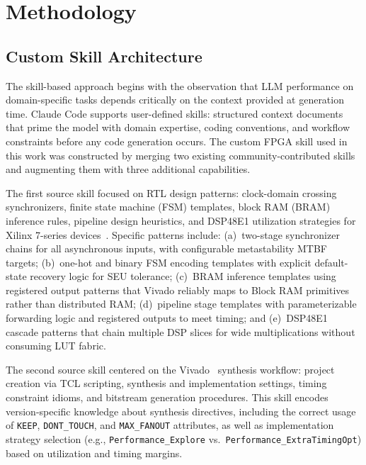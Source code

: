 \documentclass[journal]{IEEEtran}
\begin{document}
\section{Methodology}
\label{sec:methodology}

\subsection{Custom Skill Architecture}
\label{sec:skill}

The skill-based approach begins with the observation that LLM
performance on domain-specific tasks depends critically on the context
provided at generation time.  Claude Code supports user-defined skills:
structured context documents that prime the model with domain expertise,
coding conventions, and workflow constraints before any code generation
occurs.  The custom FPGA skill used in this work was constructed by
merging two existing community-contributed skills and augmenting them
with three additional capabilities.

The first source skill focused on RTL design patterns: clock-domain
crossing synchronizers, finite state machine (FSM) templates, block RAM
(BRAM) inference rules, pipeline design heuristics, and DSP48E1
utilization strategies for Xilinx 7-series
devices~\cite{xilinx2020ds180}.  Specific patterns include: (a)~two-stage
synchronizer chains for all asynchronous inputs, with configurable
metastability MTBF targets; (b)~one-hot and binary FSM encoding templates
with explicit default-state recovery logic for SEU tolerance;
(c)~BRAM inference templates using registered output patterns that
Vivado reliably maps to Block RAM primitives rather than distributed RAM;
(d)~pipeline stage templates with parameterizable forwarding logic and
registered outputs to meet timing; and (e)~DSP48E1 cascade patterns that
chain multiple DSP slices for wide multiplications without consuming LUT
fabric.

The second source skill centered on the
Vivado~\cite{xilinx2020ug901} synthesis workflow: project creation via
TCL scripting, synthesis and implementation settings, timing constraint
idioms, and bitstream generation procedures.  This skill encodes
version-specific knowledge about synthesis directives, including the
correct usage of \texttt{KEEP}, \texttt{DONT\_TOUCH}, and
\texttt{MAX\_FANOUT} attributes, as well as implementation strategy
selection (e.g., \texttt{Performance\_Explore} vs.\
\texttt{Performance\_ExtraTimingOpt}) based on utilization and timing
margins.
\end{document}
